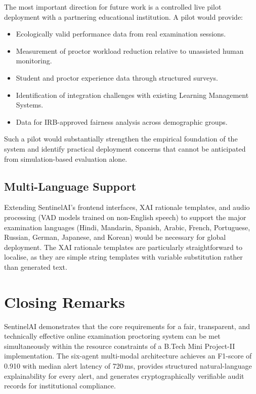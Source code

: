 The most important direction for future work is a controlled live pilot deployment with a partnering educational institution. A pilot would provide:

\begin{itemize}
    \item Ecologically valid performance data from real examination sessions.
    \item Measurement of proctor workload reduction relative to unassisted human monitoring.
    \item Student and proctor experience data through structured surveys.
    \item Identification of integration challenges with existing Learning Management Systems.
    \item Data for IRB-approved fairness analysis across demographic groups.
\end{itemize}

Such a pilot would substantially strengthen the empirical foundation of the system and identify practical deployment concerns that cannot be anticipated from simulation-based evaluation alone.

\subsection{Multi-Language Support}

Extending SentinelAI's frontend interfaces, XAI rationale templates, and audio processing (VAD models trained on non-English speech) to support the major examination languages (Hindi, Mandarin, Spanish, Arabic, French, Portuguese, Russian, German, Japanese, and Korean) would be necessary for global deployment. The XAI rationale templates are particularly straightforward to localise, as they are simple string templates with variable substitution rather than generated text.

\section{Closing Remarks}

SentinelAI demonstrates that the core requirements for a fair, transparent, and technically effective online examination proctoring system can be met simultaneously within the resource constraints of a B.Tech Mini Project-II implementation. The six-agent multi-modal architecture achieves an F1-score of 0.910 with median alert latency of 720\,ms, provides structured natural-language explainability for every alert, and generates cryptographically verifiable audit records for institutional compliance.


